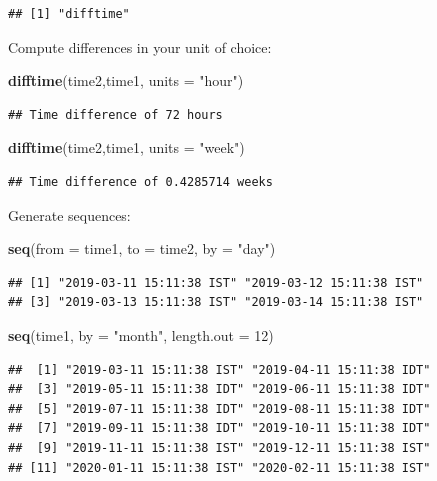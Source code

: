 \documentclass[]{book}
\newenvironment{Shaded}{\begin{snugshade}}{\end{snugshade}}
\newcommand{\KeywordTok}[1]{\textcolor[rgb]{0.13,0.29,0.53}{\textbf{#1}}}
\newcommand{\DataTypeTok}[1]{\textcolor[rgb]{0.13,0.29,0.53}{#1}}
\newcommand{\DecValTok}[1]{\textcolor[rgb]{0.00,0.00,0.81}{#1}}
\newcommand{\StringTok}[1]{\textcolor[rgb]{0.31,0.60,0.02}{#1}}
\newcommand{\NormalTok}[1]{#1}
\theoremstyle{definition}
\theoremstyle{definition}
\theoremstyle{definition}
\theoremstyle{remark}
\begin{document}
\begin{verbatim}
## [1] "difftime"
\end{verbatim}

Compute differences in your unit of choice:

\begin{Shaded}
\begin{Highlighting}[]
\KeywordTok{difftime}\NormalTok{(time2,time1, }\DataTypeTok{units =}  \StringTok{"hour"}\NormalTok{)}
\end{Highlighting}
\end{Shaded}

\begin{verbatim}
## Time difference of 72 hours
\end{verbatim}

\begin{Shaded}
\begin{Highlighting}[]
\KeywordTok{difftime}\NormalTok{(time2,time1, }\DataTypeTok{units =}  \StringTok{"week"}\NormalTok{)}
\end{Highlighting}
\end{Shaded}

\begin{verbatim}
## Time difference of 0.4285714 weeks
\end{verbatim}

Generate sequences:

\begin{Shaded}
\begin{Highlighting}[]
\KeywordTok{seq}\NormalTok{(}\DataTypeTok{from =}\NormalTok{ time1, }\DataTypeTok{to =}\NormalTok{ time2, }\DataTypeTok{by =} \StringTok{"day"}\NormalTok{) }
\end{Highlighting}
\end{Shaded}

\begin{verbatim}
## [1] "2019-03-11 15:11:38 IST" "2019-03-12 15:11:38 IST"
## [3] "2019-03-13 15:11:38 IST" "2019-03-14 15:11:38 IST"
\end{verbatim}

\begin{Shaded}
\begin{Highlighting}[]
\KeywordTok{seq}\NormalTok{(time1, }\DataTypeTok{by =} \StringTok{"month"}\NormalTok{, }\DataTypeTok{length.out =} \DecValTok{12}\NormalTok{)}
\end{Highlighting}
\end{Shaded}

\begin{verbatim}
##  [1] "2019-03-11 15:11:38 IST" "2019-04-11 15:11:38 IDT"
##  [3] "2019-05-11 15:11:38 IDT" "2019-06-11 15:11:38 IDT"
##  [5] "2019-07-11 15:11:38 IDT" "2019-08-11 15:11:38 IDT"
##  [7] "2019-09-11 15:11:38 IDT" "2019-10-11 15:11:38 IDT"
##  [9] "2019-11-11 15:11:38 IST" "2019-12-11 15:11:38 IST"
## [11] "2020-01-11 15:11:38 IST" "2020-02-11 15:11:38 IST"
\end{verbatim}
\end{document}
